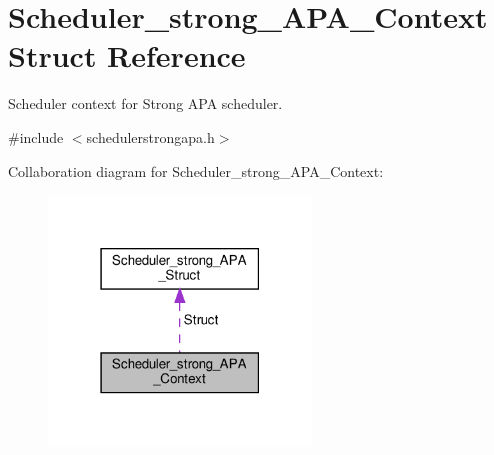 \hypertarget{structScheduler__strong__APA__Context}{}\section{Scheduler\+\_\+strong\+\_\+\+A\+P\+A\+\_\+\+Context Struct Reference}
\label{structScheduler__strong__APA__Context}


Scheduler context for Strong A\+PA scheduler.  




{\ttfamily \#include $<$schedulerstrongapa.\+h$>$}



Collaboration diagram for Scheduler\+\_\+strong\+\_\+\+A\+P\+A\+\_\+\+Context\+:\nopagebreak
\begin{figure}[H]
\begin{center}
\leavevmode
\includegraphics[width=198pt]{structScheduler__strong__APA__Context__coll__graph}
\end{center}
\end{figure}
